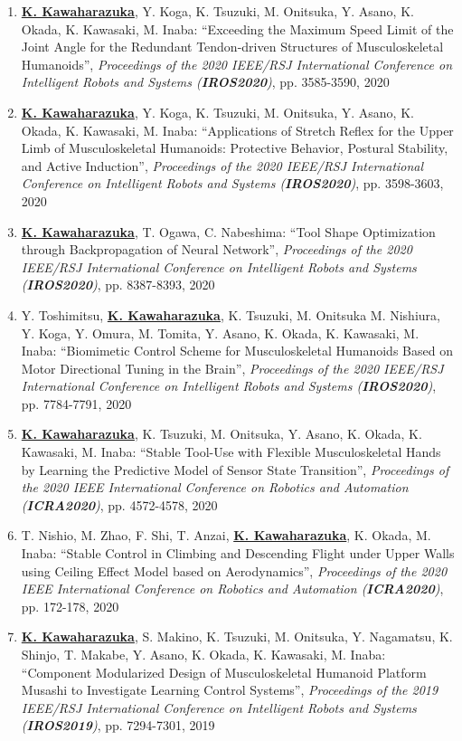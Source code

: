 \documentclass[letterpaper]{article}
\begin{document}
\begin{enumerate}
\item \underline{\textbf{K. Kawaharazuka}}, Y. Koga, K. Tsuzuki, M. Onitsuka, Y. Asano, K. Okada, K. Kawasaki, M. Inaba: ``Exceeding the Maximum Speed Limit of the Joint Angle for the Redundant Tendon-driven Structures of Musculoskeletal Humanoids'', \textit{Proceedings of the 2020 IEEE/RSJ International Conference on Intelligent Robots and Systems (\textit{\textbf{IROS2020}})}, pp. 3585-3590, 2020
\item \underline{\textbf{K. Kawaharazuka}}, Y. Koga, K. Tsuzuki, M. Onitsuka, Y. Asano, K. Okada, K. Kawasaki, M. Inaba: ``Applications of Stretch Reflex for the Upper Limb of Musculoskeletal Humanoids: Protective Behavior, Postural Stability, and Active Induction'', \textit{Proceedings of the 2020 IEEE/RSJ International Conference on Intelligent Robots and Systems (\textit{\textbf{IROS2020}})}, pp. 3598-3603, 2020
\item \underline{\textbf{K. Kawaharazuka}}, T. Ogawa, C. Nabeshima: ``Tool Shape Optimization through Backpropagation of Neural Network'', \textit{Proceedings of the 2020 IEEE/RSJ International Conference on Intelligent Robots and Systems (\textit{\textbf{IROS2020}})}, pp. 8387-8393, 2020
\item Y. Toshimitsu, \underline{\textbf{K. Kawaharazuka}}, K. Tsuzuki, M. Onitsuka M. Nishiura, Y. Koga, Y. Omura, M. Tomita, Y. Asano, K. Okada, K. Kawasaki, M. Inaba: ``Biomimetic Control Scheme for Musculoskeletal Humanoids Based on Motor Directional Tuning in the Brain'', \textit{Proceedings of the 2020 IEEE/RSJ International Conference on Intelligent Robots and Systems (\textit{\textbf{IROS2020}})}, pp. 7784-7791, 2020
\item \underline{\textbf{K. Kawaharazuka}}, K. Tsuzuki, M. Onitsuka, Y. Asano, K. Okada, K. Kawasaki, M. Inaba: ``Stable Tool-Use with Flexible Musculoskeletal Hands by Learning the Predictive Model of Sensor State Transition'', \textit{Proceedings of the 2020 IEEE International Conference on Robotics and Automation (\textit{\textbf{ICRA2020}})}, pp. 4572-4578, 2020
\item T. Nishio, M. Zhao, F. Shi, T. Anzai, \underline{\textbf{K. Kawaharazuka}}, K. Okada, M. Inaba: ``Stable Control in Climbing and Descending Flight under Upper Walls using Ceiling Effect Model based on Aerodynamics'', \textit{Proceedings of the 2020 IEEE International Conference on Robotics and Automation (\textit{\textbf{ICRA2020}})}, pp. 172-178, 2020
\item \underline{\textbf{K. Kawaharazuka}}, S. Makino, K. Tsuzuki, M. Onitsuka, Y. Nagamatsu, K. Shinjo, T. Makabe, Y. Asano, K. Okada, K. Kawasaki, M. Inaba: ``Component Modularized Design of Musculoskeletal Humanoid Platform Musashi to Investigate Learning Control Systems'', \textit{Proceedings of the 2019 IEEE/RSJ International Conference on Intelligent Robots and Systems (\textit{\textbf{IROS2019}})}, pp. 7294-7301, 2019

\end{enumerate}
\end{document}
